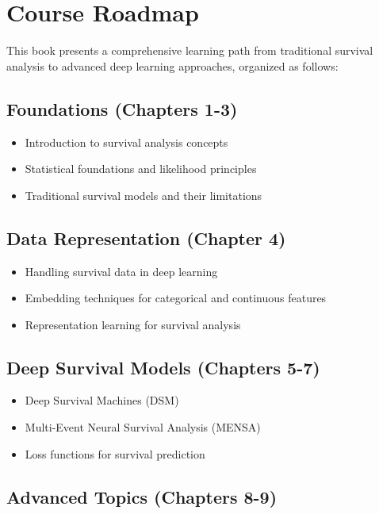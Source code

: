 \section{Course Roadmap}

This book presents a comprehensive learning path from traditional survival analysis to advanced deep learning approaches, organized as follows:

\subsection{Foundations (Chapters 1-3)}

\begin{itemize}
    \item Introduction to survival analysis concepts
    \item Statistical foundations and likelihood principles
    \item Traditional survival models and their limitations
\end{itemize}

\subsection{Data Representation (Chapter 4)}

\begin{itemize}
    \item Handling survival data in deep learning
    \item Embedding techniques for categorical and continuous features
    \item Representation learning for survival analysis
\end{itemize}

\subsection{Deep Survival Models (Chapters 5-7)}

\begin{itemize}
    \item Deep Survival Machines (DSM)
    \item Multi-Event Neural Survival Analysis (MENSA)
    \item Loss functions for survival prediction
\end{itemize}

\subsection{Advanced Topics (Chapters 8-9)}

